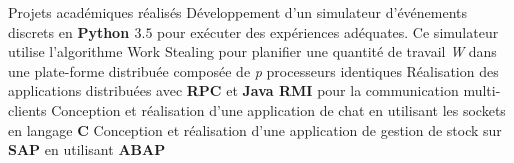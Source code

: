 
\begin{rubric}{Projets académiques réalisés}
%
    \entry*[]      	Développement d'un simulateur d'événements discrets en \textbf{Python $3.5$} pour exécuter des expériences adéquates. Ce simulateur utilise l'algorithme Work Stealing pour planifier une quantité de travail \textit{W} dans une plate-forme distribuée composée de \textit{p} processeurs identiques
\entry*[]	Réalisation des applications distribuées avec \textbf{RPC} et \textbf{Java RMI} pour la communication multi-clients
\entry*[]	Conception et réalisation d’une application de chat en utilisant les sockets en langage \textbf{C}
\entry*[]	Conception et réalisation d’une application de gestion de stock sur \textbf{SAP} en utilisant \textbf{ABAP}
\end{rubric}
